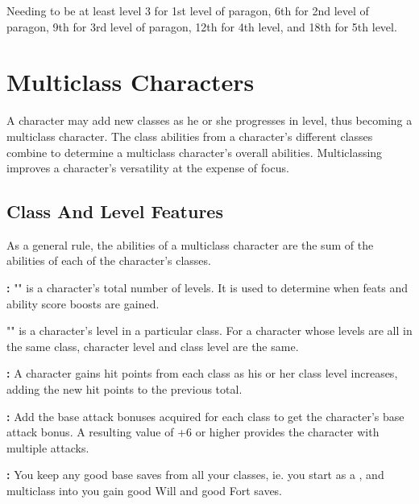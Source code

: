 Needing to be at least level 3 for 1st level of paragon, 6th for 2nd level of paragon, 9th for 3rd level of paragon, 12th for 4th level, and 18th for 5th level.


\pagebreak

\pagebreak

\pagebreak

\pagebreak

\pagebreak

\section{Multiclass Characters}

A character may add new classes as he or she progresses in level, thus becoming 
a multiclass character. The class abilities from a character's different classes 
combine to determine a multiclass character's overall abilities. Multiclassing 
improves a character's versatility at the expense of focus.



\subsection{Class And Level Features}

As a general rule, the abilities of a multiclass character are the sum of the abilities 
of each of the character's classes.

\textbf{:} "" is a character's total number of levels. It is used to determine when feats and ability score boosts are gained.

"" is a character's level in a particular class. For a character whose levels are all in the same class, character level and class level are the same.

\textbf{:} A character gains hit points from each class as his or her class level increases, adding the new hit points to the previous total. 

\textbf{:} Add the base attack bonuses acquired for each class to get the character's base attack bonus. A resulting value of +6 or higher provides the character with multiple attacks. 

\textbf{:} You keep any good base saves from all your classes, ie. you start as a , and multiclass into  you gain good Will and good Fort saves.

